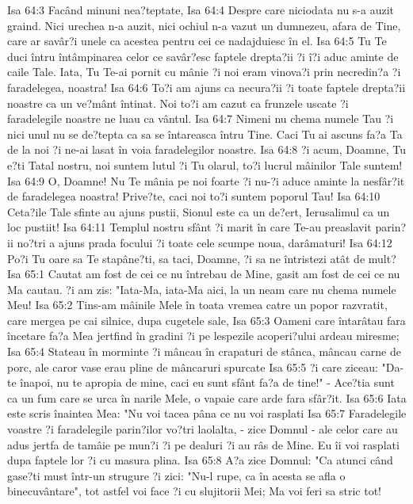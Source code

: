 Isa 64:3  Facând minuni nea?teptate,
Isa 64:4  Despre care niciodata nu s-a auzit graind. Nici urechea n-a auzit, nici ochiul n-a vazut un dumnezeu, afara de Tine, care ar savâr?i unele ca acestea pentru cei ce nadajduiesc în el.
Isa 64:5  Tu Te duci întru întâmpinarea celor ce savâr?esc faptele drepta?ii ?i î?i aduc aminte de caile Tale. Iata, Tu Te-ai pornit cu mânie ?i noi eram vinova?i prin necredin?a ?i faradelegea, noastra!
Isa 64:6  To?i am ajuns ca necura?ii ?i toate faptele drepta?ii noastre ca un ve?mânt întinat. Noi to?i am cazut ca frunzele uscate ?i faradelegile noastre ne luau ca vântul.
Isa 64:7  Nimeni nu chema numele Tau ?i nici unul nu se de?tepta ca sa se întareasca întru Tine. Caci Tu ai ascuns fa?a Ta de la noi ?i ne-ai lasat în voia faradelegilor noastre.
Isa 64:8  ?i acum, Doamne, Tu e?ti Tatal nostru, noi suntem lutul ?i Tu olarul, to?i lucrul mâinilor Tale suntem!
Isa 64:9  O, Doamne! Nu Te mânia pe noi foarte ?i nu-?i aduce aminte la nesfâr?it de faradelegea noastra! Prive?te, caci noi to?i suntem poporul Tau!
Isa 64:10  Ceta?ile Tale sfinte au ajuns pustii, Sionul este ca un de?ert, Ierusalimul ca un loc pustiit!
Isa 64:11  Templul nostru sfânt ?i marit în care Te-au preaslavit parin?ii no?tri a ajuns prada focului ?i toate cele scumpe noua, darâmaturi!
Isa 64:12  Po?i Tu oare sa Te stapâne?ti, sa taci, Doamne, ?i sa ne întristezi atât de mult?
Isa 65:1  Cautat am fost de cei ce nu întrebau de Mine, gasit am fost de cei ce nu Ma cautau. ?i am zis: "Iata-Ma, iata-Ma aici, la un neam care nu chema numele Meu!
Isa 65:2  Tins-am mâinile Mele în toata vremea catre un popor razvratit, care mergea pe cai silnice, dupa cugetele sale,
Isa 65:3  Oameni care întarâtau fara încetare fa?a Mea jertfind în gradini ?i pe lespezile acoperi?ului ardeau miresme;
Isa 65:4  Stateau în morminte ?i mâncau în crapaturi de stânca, mâncau carne de porc, ale caror vase erau pline de mâncaruri spurcate
Isa 65:5  ?i care ziceau: "Da-te înapoi, nu te apropia de mine, caci eu sunt sfânt fa?a de tine!" - Ace?tia sunt ca un fum care se urca în narile Mele, o vapaie care arde fara sfâr?it.
Isa 65:6  Iata este scris înaintea Mea: "Nu voi tacea pâna ce nu voi rasplati
Isa 65:7  Faradelegile voastre ?i faradelegile parin?ilor vo?tri laolalta, - zice Domnul - ale celor care au adus jertfa de tamâie pe mun?i ?i pe dealuri ?i au râs de Mine. Eu îi voi rasplati dupa faptele lor ?i cu masura plina.
Isa 65:8  A?a zice Domnul: "Ca atunci când gase?ti must într-un strugure ?i zici: "Nu-l rupe, ca în acesta se afla o binecuvântare", tot astfel voi face ?i cu slujitorii Mei; Ma voi feri sa stric tot!
